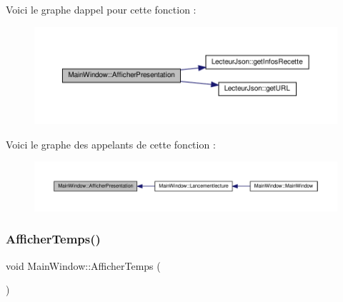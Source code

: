 Voici le graphe d\textquotesingle{}appel pour cette fonction \+:
\nopagebreak
\begin{figure}[H]
\begin{center}
\leavevmode
\includegraphics[width=350pt]{class_main_window_a9bf06dfcc398454facb39e71ebf32550_cgraph}
\end{center}
\end{figure}
Voici le graphe des appelants de cette fonction \+:
\nopagebreak
\begin{figure}[H]
\begin{center}
\leavevmode
\includegraphics[width=350pt]{class_main_window_a9bf06dfcc398454facb39e71ebf32550_icgraph}
\end{center}
\end{figure}
\mbox{\label{class_main_window_a33811a52abf8f1ce71ec4e150d9c9ac8}} 
\subsubsection{\texorpdfstring{Afficher\+Temps()}{AfficherTemps()}}
{\footnotesize\ttfamily void Main\+Window\+::\+Afficher\+Temps (\begin{DoxyParamCaption}{ }\end{DoxyParamCaption})}

